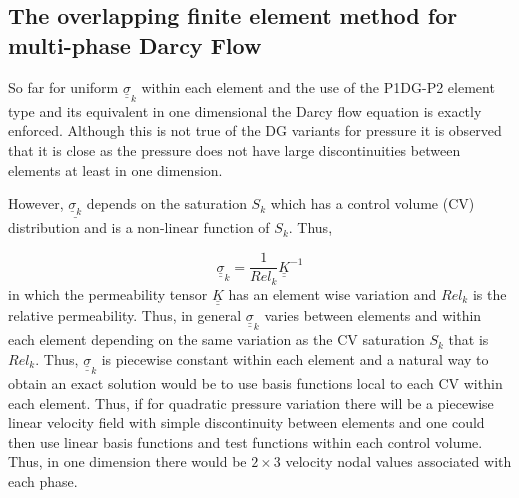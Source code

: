 \subsection{The overlapping finite element method for multi-phase Darcy Flow}

So far for uniform ${\underline{\underline \sigma}}_k$ within each element and the use of the P1DG-P2 element type
and its equivalent in one dimensional the Darcy flow equation is
exactly enforced. Although this is not true of the DG variants
for pressure it is observed that it is close
as the pressure does not have large discontinuities
between elements at least in one dimension.

However, ${\underline{\underline \sigma_k}}$ depends on the saturation $S_k$ which has
a control volume (CV) distribution and is a non-linear function of $S_k$.
Thus,

\begin{equation}
{\underline {\underline \sigma}}_k
= \frac{1}{{Rel}_k} {\underline{\underline K}}^{-1}
\end{equation}
in which the permeability tensor
${\underline{\underline K}}$ has an element wise variation
and ${Rel}_k$ is the relative permeability.
Thus, in general ${\underline {\underline \sigma}}_k$ varies between elements and within each element
depending on the same variation as the CV saturation $S_k$ that is $Rel_k$.
Thus, ${\underline {\underline \sigma}}_k$ is piecewise constant
within each element and a natural
way to obtain an exact solution would be to use basis functions
local to each CV within each element.
Thus, if for quadratic pressure variation there will be
a piecewise
linear velocity field with simple discontinuity between
elements and one could then use linear basis functions
and test functions within each control volume. Thus, in one dimension
there would be $2\times 3$ velocity nodal values associated with
each phase.

